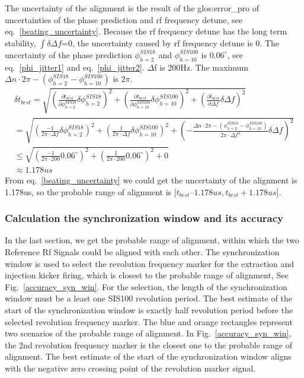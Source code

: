 The uncertainty of the alignment is the result of the \gls{glos:error_pro} of uncertainties of the phase prediction and rf frequency detune, see eq.~\ref{beating_uncertainty}. Because the rf frequency detune has the long term stability, $\int\delta \Delta f$=0, the uncertainty caused by rf frequency detune is 0. The uncertainty of the phase prediction $\phi_{h=2}^{SIS18}$ and $\phi_{h=10}^{SIS100}$ is $0.06^\circ$, see eq.~\ref{phi_jitter1} and eq.~\ref{phi_jitter2}. $\Delta$f is 200Hz. The maximum ${\Delta n} \cdot {2\pi} - (\phi_{h=2}^{SIS18}-\phi_{h=10}^{SIS100})$ is $2\pi$.
\begin{equation}
\begin{aligned}
\delta t_{best} =\sqrt {(\frac {\partial t_{best}}{\partial \phi_{h=2}^{SIS18}}\delta \phi_{h=2}^{SIS18})^2 + (\frac {\partial t_{best}}{\partial \phi_{h=10}^{SIS100}}\delta \phi_{h=10}^{SIS100})^2+(\frac {\partial t_{best}}{\partial \Delta f}\delta \Delta f)^2} \\
 =\sqrt {(\frac{-1}{{2\pi} \cdot {\Delta f}}\delta \phi_{h=2}^{SIS18})^2+(\frac{1}{{2\pi} \cdot {\Delta f}}\delta \phi_{h=10}^{SIS100})^2+(-\frac{{\Delta n} \cdot {2\pi} - (\phi_{h=2}^{SIS18}-\phi_{h=10}^{SIS100})}{{2\pi} \cdot {\Delta f}^2}\delta \Delta f)^2} \\
\le \sqrt {(\frac{-1}{{2\pi} \cdot {200}}0.06^\circ)^2+(\frac{1}{{2\pi} \cdot {200}}0.06^\circ)^2+0}\\
\approx 1.178us \label{beating_uncertainty}
\end{aligned}
\end{equation}
From eq.~\ref{beating_uncertainty} we could get the uncertainty of the alignment is 1.178us, so the probable range of alignment is [$t_{best} – 1.178us, t_{best}+ 1.178us$].
\subsubsection{Calculation the synchronization window and its accuracy}
In the last section, we get the probable range of alignment, within which the two Reference Rf Signals could be aligned with each other. The synchronization window is used to select the revolution frequency marker for the extraction and injection kicker firing, which is closest to the probable range of alignment, See Fig.~\ref{accuracy_syn_win}. For the selection, the length of the synchronization window must be a least one SIS100 revolution period. The best estimate of the start of the synchronization window is exactly half revolution period before the selected revolution frequency marker. The blue and orange rectangles represent two scenarios of the probable range of alignment. In Fig.~\ref{accuracy_syn_win}, the 2nd revolution frequency marker is the closest one to the probable range of alignment. The best estimate of the start of the synchronization window aligns with the negative zero crossing point of the revolution marker signal.

